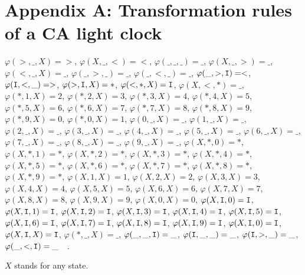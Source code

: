 \documentclass[pra,amsfonts, twocolumn]{revtex4}
\begin{document}
 \appendix
 \section*{Appendix A: Transformation rules of a CA light clock}
 \label{a:lightclock}

 $\varphi (>,\_,X) = >$, $\varphi (X,\_,<) = <$, $\varphi (\_,\_,\_) =
 \_$, $\varphi (X,\_,>) = \_$, $\varphi (<,\_,X) = \_$, $\varphi
 (\_,>,\_) = \_$, $\varphi (\_,<,\_) = \_$, $\varphi (\_,>,{\tt I}) = <$,
 $\varphi ({\tt I},<,\_) = >$, $\varphi (>,{\tt I},X) = *$, $\varphi
 (<,*,X) = {\tt I}$, $\varphi (X,<,*) = \_$, $\varphi (* ,1,X) = 2$,
 $\varphi (*,2,X) = 3$, $\varphi (*,3,X) = 4$, $\varphi (*,4,X ) = 5$,
$\varphi (*,5,X) = 6$, $\varphi (*,6,X) = 7$, $\varphi (*,7,X) = 8$,
$\varphi ( *,8,X) = 9$, $\varphi (*,9,X) = 0$, $\varphi (*,0,X) = 1$,
$\varphi (0,\_,X ) = \_$, $\varphi (1,\_,X) = \_$, $\varphi (2,\_,X) =
\_$, $\varphi (3,\_,X) = \_$, $\varphi ( 4,\_,X) = \_$, $\varphi
(5,\_,X) = \_$, $\varphi (6,\_,X) = \_$, $\varphi (7,\_,X ) = \_$,
$\varphi (8,\_,X) = \_$, $\varphi (9,\_,X) = \_$, $\varphi (X,*,0) = *$,
$\varphi (X ,*,1) = *$, $\varphi (X,*,2) = *$, $\varphi (X,*,3) = *$,
$\varphi (X,*,4 ) = *$, $\varphi (X,*,5) = *$, $\varphi (X,*,6) = *$,
$\varphi (X,*,7) = *$, $\varphi (X ,*,8) = *$, $\varphi (X,*,9) = *$,
$\varphi (X,1,X) = 1$, $\varphi (X,2,X) = 2$, $\varphi (X,3,X) = 3$,
$\varphi (X,4,X) = 4$, $\varphi (X,5,X) = 5$, $\varphi (X,6,X) = 6$,
$\varphi (X,7,X) = 7$, $\varphi (X,8,X) = 8$, $\varphi (X,9,X) = 9$,
$\varphi (X,0,X) = 0$, $\varphi (X,{\tt I},0) = {\tt I}$, $\varphi
(X,{\tt I},1) = {\tt I}$, $\varphi (X,{\tt I},2) = {\tt I}$, $\varphi
(X,{\tt I},3) = {\tt I}$, $\varphi (X,{\tt I},4) = {\tt I}$, $\varphi
(X,{\tt I},5) = {\tt I}$, $\varphi (X,{\tt I},6) = {\tt I}$, $\varphi
(X,{\tt I},7) = {\tt I}$, $\varphi (X ,{\tt I},8) = {\tt I}$, $\varphi
(X,{\tt I},9) = {\tt I}$, $\varphi (X,{\tt I},0) = {\tt I}$, $\varphi
(X,{\tt I},X) = {\tt I}$, $\varphi (* ,\_,X) = \_$, $\varphi (\_,\_,{\tt
I}) = \_$, $\varphi ({\tt I},\_,\_) = \_$, $\varphi ({\tt I},>,\_ ) =
\_$, $\varphi (\_,<,{\tt I}) = \_ \quad$.

$X$ stands for any state.
\end{document}
